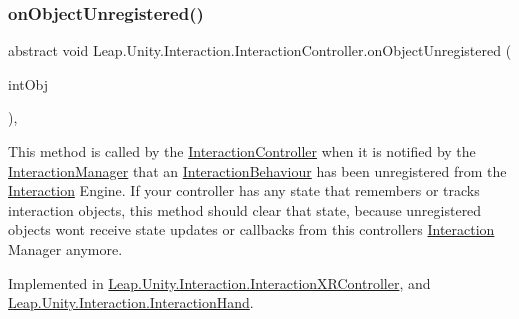 \subsubsection{\texorpdfstring{onObjectUnregistered()}{onObjectUnregistered()}}
{\footnotesize\ttfamily abstract void Leap.\+Unity.\+Interaction.\+Interaction\+Controller.\+on\+Object\+Unregistered (\begin{DoxyParamCaption}\item[{\mbox{\hyperlink{interface_leap_1_1_unity_1_1_interaction_1_1_i_interaction_behaviour}{I\+Interaction\+Behaviour}}}]{int\+Obj }\end{DoxyParamCaption})\hspace{0.3cm}{\ttfamily [protected]}, {}}



This method is called by the \mbox{\hyperlink{class_leap_1_1_unity_1_1_interaction_1_1_interaction_controller}{Interaction\+Controller}} when it is notified by the \mbox{\hyperlink{class_leap_1_1_unity_1_1_interaction_1_1_interaction_manager}{Interaction\+Manager}} that an \mbox{\hyperlink{class_leap_1_1_unity_1_1_interaction_1_1_interaction_behaviour}{Interaction\+Behaviour}} has been unregistered from the \mbox{\hyperlink{namespace_leap_1_1_unity_1_1_interaction}{Interaction}} Engine. If your controller has any state that remembers or tracks interaction objects, this method should clear that state, because unregistered objects won\textquotesingle{}t receive state updates or callbacks from this controller\textquotesingle{}s \mbox{\hyperlink{namespace_leap_1_1_unity_1_1_interaction}{Interaction}} Manager anymore. 



Implemented in \mbox{\hyperlink{class_leap_1_1_unity_1_1_interaction_1_1_interaction_x_r_controller_ab287ac4fbd0ba8471ef9787a371470ef}{Leap.\+Unity.\+Interaction.\+Interaction\+X\+R\+Controller}}, and \mbox{\hyperlink{class_leap_1_1_unity_1_1_interaction_1_1_interaction_hand_af6558dfad2bffcf4126ded024dc08c6d}{Leap.\+Unity.\+Interaction.\+Interaction\+Hand}}.

\mbox{\label{class_leap_1_1_unity_1_1_interaction_1_1_interaction_controller_ad9c7c365e25236d6c2441d60d9ce6130}} 
